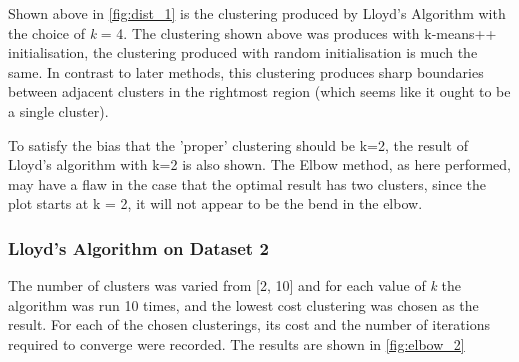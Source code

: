 \documentclass[12pt]{article}
\begin{document}
Shown above in \ref{fig:dist_1} is the clustering produced by Lloyd's Algorithm
with the choice of \emph{k} = 4. The clustering shown above was produces with k-means++
initialisation, the clustering produced with random initialisation is much the same.
In contrast to later methods, this clustering produces sharp boundaries between
adjacent clusters in the rightmost region (which seems like it ought to be a single cluster).

To satisfy the bias that the 'proper' clustering should be k=2, the result of Lloyd's
algorithm with k=2 is also shown. The Elbow method, as here performed, may have a flaw in the case that
the optimal result has two clusters, since the plot starts at k = 2, it will
not appear to be the bend in the elbow.

\subsubsection{Lloyd's Algorithm on Dataset 2}

The number of clusters was varied from [2, 10] and for each value of \emph{k} the
algorithm was run 10 times, and the lowest cost clustering was chosen as the
result. For each of the chosen clusterings, its cost and the number of iterations
required to converge were recorded. The results are shown in \ref{fig:elbow_2}
\end{document}
